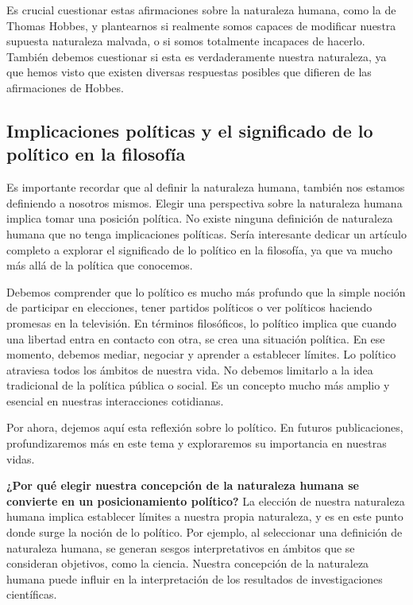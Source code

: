 \documentclass[
  letterpaper,
  DIV=11,
  numbers=noendperiod]{scrartcl}
\begin{document}
Es crucial cuestionar estas afirmaciones sobre la naturaleza humana,
como la de Thomas Hobbes, y plantearnos si realmente somos capaces de
modificar nuestra supuesta naturaleza malvada, o si somos totalmente
incapaces de hacerlo. También debemos cuestionar si esta es
verdaderamente nuestra naturaleza, ya que hemos visto que existen
diversas respuestas posibles que difieren de las afirmaciones de Hobbes.

\hypertarget{implicaciones-poluxedticas-y-el-significado-de-lo-poluxedtico-en-la-filosofuxeda}{%
\subsection{Implicaciones políticas y el significado de lo político en
la
filosofía}\label{implicaciones-poluxedticas-y-el-significado-de-lo-poluxedtico-en-la-filosofuxeda}}

Es importante recordar que al definir la naturaleza humana, también nos
estamos definiendo a nosotros mismos. Elegir una perspectiva sobre la
naturaleza humana implica tomar una posición política. No existe ninguna
definición de naturaleza humana que no tenga implicaciones políticas.
Sería interesante dedicar un artículo completo a explorar el significado
de lo político en la filosofía, ya que va mucho más allá de la política
que conocemos.

Debemos comprender que lo político es mucho más profundo que la simple
noción de participar en elecciones, tener partidos políticos o ver
políticos haciendo promesas en la televisión. En términos filosóficos,
lo político implica que cuando una libertad entra en contacto con otra,
se crea una situación política. En ese momento, debemos mediar, negociar
y aprender a establecer límites. Lo político atraviesa todos los ámbitos
de nuestra vida. No debemos limitarlo a la idea tradicional de la
política pública o social. Es un concepto mucho más amplio y esencial en
nuestras interacciones cotidianas.

Por ahora, dejemos aquí esta reflexión sobre lo político. En futuros
publicaciones, profundizaremos más en este tema y exploraremos su
importancia en nuestras vidas.

\textbf{¿Por qué elegir nuestra concepción de la naturaleza humana se
convierte en un posicionamiento político?} La elección de nuestra
naturaleza humana implica establecer límites a nuestra propia
naturaleza, y es en este punto donde surge la noción de lo político. Por
ejemplo, al seleccionar una definición de naturaleza humana, se generan
sesgos interpretativos en ámbitos que se consideran objetivos, como la
ciencia. Nuestra concepción de la naturaleza humana puede influir en la
interpretación de los resultados de investigaciones científicas.
\end{document}
